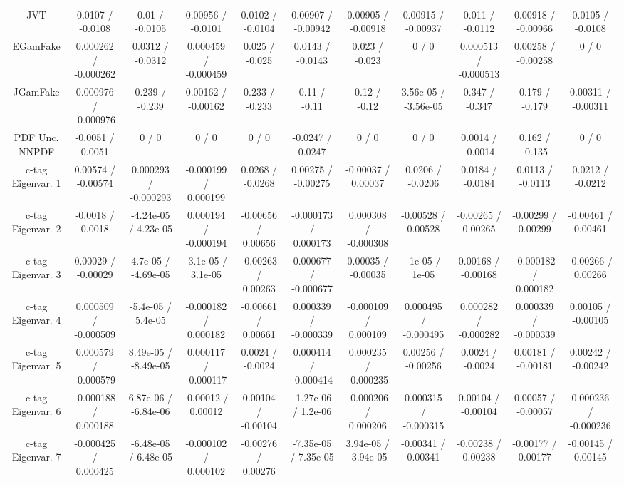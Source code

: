 \begin{table}[htbp]
\begin{center}
\begin{tabular}{|c|c|c|c|c|c|c|c|c|c|c|}
  JVT & 0.0107 / -0.0108 & 0.01 / -0.0105 & 0.00956 / -0.0101 & 0.0102 / -0.0104 & 0.00907 / -0.00942 & 0.00905 / -0.00918 & 0.00915 / -0.00937 & 0.011 / -0.0112 & 0.00918 / -0.00966 & 0.0105 / -0.0108 \\ 
  EGamFake & 0.000262 / -0.000262 & 0.0312 / -0.0312 & 0.000459 / -0.000459 & 0.025 / -0.025 & 0.0143 / -0.0143 & 0.023 / -0.023 & 0 / 0 & 0.000513 / -0.000513 & 0.00258 / -0.00258 & 0 / 0 \\ 
  JGamFake & 0.000976 / -0.000976 & 0.239 / -0.239 & 0.00162 / -0.00162 & 0.233 / -0.233 & 0.11 / -0.11 & 0.12 / -0.12 & 3.56e-05 / -3.56e-05 & 0.347 / -0.347 & 0.179 / -0.179 & 0.00311 / -0.00311 \\ 
  PDF Unc. NNPDF & -0.0051 / 0.0051 & 0 / 0 & 0 / 0 & 0 / 0 & -0.0247 / 0.0247 & 0 / 0 & 0 / 0 & 0.0014 / -0.0014 & 0.162 / -0.135 & 0 / 0 \\ 
  c-tag Eigenvar. 1 & 0.00574 / -0.00574 & 0.000293 / -0.000293 & -0.000199 / 0.000199 & 0.0268 / -0.0268 & 0.00275 / -0.00275 & -0.00037 / 0.00037 & 0.0206 / -0.0206 & 0.0184 / -0.0184 & 0.0113 / -0.0113 & 0.0212 / -0.0212 \\ 
  c-tag Eigenvar. 2 & -0.0018 / 0.0018 & -4.24e-05 / 4.23e-05 & 0.000194 / -0.000194 & -0.00656 / 0.00656 & -0.000173 / 0.000173 & 0.000308 / -0.000308 & -0.00528 / 0.00528 & -0.00265 / 0.00265 & -0.00299 / 0.00299 & -0.00461 / 0.00461 \\ 
  c-tag Eigenvar. 3 & 0.00029 / -0.00029 & 4.7e-05 / -4.69e-05 & -3.1e-05 / 3.1e-05 & -0.00263 / 0.00263 & 0.000677 / -0.000677 & 0.00035 / -0.00035 & -1e-05 / 1e-05 & 0.00168 / -0.00168 & -0.000182 / 0.000182 & -0.00266 / 0.00266 \\ 
  c-tag Eigenvar. 4 & 0.000509 / -0.000509 & -5.4e-05 / 5.4e-05 & -0.000182 / 0.000182 & -0.00661 / 0.00661 & 0.000339 / -0.000339 & -0.000109 / 0.000109 & 0.000495 / -0.000495 & 0.000282 / -0.000282 & 0.000339 / -0.000339 & 0.00105 / -0.00105 \\ 
  c-tag Eigenvar. 5 & 0.000579 / -0.000579 & 8.49e-05 / -8.49e-05 & 0.000117 / -0.000117 & 0.0024 / -0.0024 & 0.000414 / -0.000414 & 0.000235 / -0.000235 & 0.00256 / -0.00256 & 0.0024 / -0.0024 & 0.00181 / -0.00181 & 0.00242 / -0.00242 \\ 
  c-tag Eigenvar. 6 & -0.000188 / 0.000188 & 6.87e-06 / -6.84e-06 & -0.00012 / 0.00012 & 0.00104 / -0.00104 & -1.27e-06 / 1.2e-06 & -0.000206 / 0.000206 & 0.000315 / -0.000315 & 0.00104 / -0.00104 & 0.00057 / -0.00057 & 0.000236 / -0.000236 \\ 
  c-tag Eigenvar. 7 & -0.000425 / 0.000425 & -6.48e-05 / 6.48e-05 & -0.000102 / 0.000102 & -0.00276 / 0.00276 & -7.35e-05 / 7.35e-05 & 3.94e-05 / -3.94e-05 & -0.00341 / 0.00341 & -0.00238 / 0.00238 & -0.00177 / 0.00177 & -0.00145 / 0.00145 \\ 

\end{tabular}
\end{center}
\end{table}
